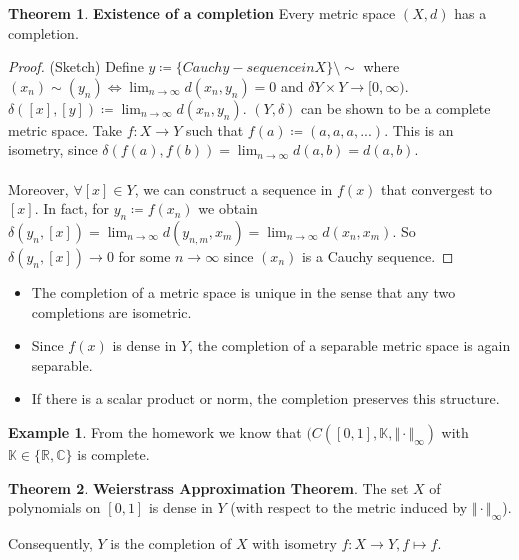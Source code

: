 \documentclass[10pt,a4paper]{article}
\theoremstyle{definition}
\theoremstyle{cor}
\theoremstyle{theorem}
\newtheorem{theorem}{Theorem}
\theoremstyle{lemma}
\theoremstyle{example}
\newtheorem{example}{Example}
\theoremstyle{remark}
\begin{document}
\begin{theorem}
\textbf{Existence of a completion} Every metric space $(X, d)$ has a completion.
\end{theorem}
\begin{proof}
(Sketch) Define $y\coloneqq \{ Cauchy-sequence in X\} \setminus \sim $ where $(x_n) \sim (y_n) \Leftrightarrow \lim_{n \rightarrow \infty} d(x_n, y_n) = 0$ and $\delta Y\times Y \rightarrow [0, \infty)$.  $\delta([x], [y]) \coloneqq \lim_{n\rightarrow\infty} d(x_n, y_n)$. $(Y, \delta)$ can be shown to be a complete metric space. Take $f: X\rightarrow Y$ such that $f(a) \coloneqq (a, a, a, ...)$. This is an isometry, since $\delta(f(a), f(b)) = \lim_{n\rightarrow\infty} d(a, b) = d(a, b)$. 
\\ \\
Moreover, $\forall [x] \in Y$, we can construct a sequence in $f(x)$ that convergest to $[x]$. In fact, for $y_n \coloneqq f(x_n)$ we obtain $\delta(y_n, [x]) = \lim_{n\rightarrow\infty} d(y_{n,m}, x_m) = \lim_{n\rightarrow\infty} d(x_n, x_m)$. So $\delta(y_n, [x]) \rightarrow 0$ for some $n \rightarrow \infty$ since $(x_n)$ is a Cauchy sequence. 
\end{proof}
\begin{itemize}
\item The completion of a metric space is unique in the sense that any two completions are isometric. 
\item Since $f(x)$ is dense in $Y$, the completion of a separable metric space is again separable. 
\item If there is a scalar product or norm, the completion preserves this  structure.
\end{itemize}

\begin{example}
From the homework we know that $(C([0, 1], \mathbb{K}, \Vert\cdot\Vert_{\infty})$ with $\mathbb{K} \in \{ \mathbb{R}, \mathbb{C}\}$ is complete.
\end{example}

\begin{theorem}
\textbf{Weierstrass Approximation Theorem}. The set $X$ of polynomials on $[0, 1]$ is dense in $Y$ (with respect to the metric induced by $\Vert \cdot \Vert_{\infty}$).
\end{theorem}
\noindent Consequently, $Y$ is the completion of $X$ with isometry $f: X \rightarrow Y, f \mapsto f$.
\end{document}
